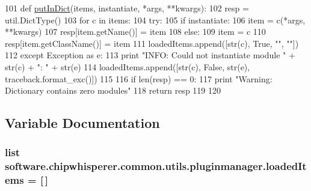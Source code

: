 \begin{DoxyCode}
101 \textcolor{keyword}{def }\hyperlink{namespacesoftware_1_1chipwhisperer_1_1common_1_1utils_1_1pluginmanager_aef75a345b6737524966068654fab2415}{putInDict}(items, instantiate, *args, **kwargs):
102     resp = util.DictType()
103     \textcolor{keywordflow}{for} c \textcolor{keywordflow}{in} items:
104         \textcolor{keywordflow}{try}:
105             \textcolor{keywordflow}{if} instantiate:
106                 item = c(*args, **kwargs)
107                 resp[item.getName()] = item
108             \textcolor{keywordflow}{else}:
109                 item = c
110                 resp[item.getClassName()] = item
111             loadedItems.append([str(c), \textcolor{keyword}{True}, \textcolor{stringliteral}{""}, \textcolor{stringliteral}{""}])
112         \textcolor{keywordflow}{except} Exception \textcolor{keyword}{as} e:
113             \textcolor{keywordflow}{print} \textcolor{stringliteral}{"INFO: Could not instantiate module "} + str(c) + \textcolor{stringliteral}{": "} + str(e)
114             loadedItems.append([str(c), \textcolor{keyword}{False}, str(e), traceback.format\_exc()])
115 
116     \textcolor{keywordflow}{if} len(resp) == 0:
117         \textcolor{keywordflow}{print} \textcolor{stringliteral}{"Warning: Dictionary contains zero modules"}
118     \textcolor{keywordflow}{return} resp
119 
120 
\end{DoxyCode}


\subsection{Variable Documentation}
\hypertarget{namespacesoftware_1_1chipwhisperer_1_1common_1_1utils_1_1pluginmanager_ad3fbdbdc78196085b0709f08be567525}{}
\subsubsection[{loaded\+Items}]{\setlength{\rightskip}{0pt plus 5cm}list software.\+chipwhisperer.\+common.\+utils.\+pluginmanager.\+loaded\+Items = \mbox{[}$\,$\mbox{]}}\label{namespacesoftware_1_1chipwhisperer_1_1common_1_1utils_1_1pluginmanager_ad3fbdbdc78196085b0709f08be567525}
